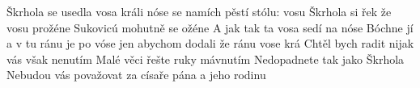 \begin{TEXT}{Škrhola}
\SLOKA {}   se  \NL
{}usedla vosa králi nóse \NL
{} se namích  pěstí  stólu:  \NL
{}  vosu  
\SLOKA Škrhola si řek že vosu prožéne \NL
Sukovicú mohutně se ožéne \NL
A jak tak ta vosa sedí na nóse \NL
Bóchne jí a v tu ránu je po vóse 
\SLOKA {} jen abychom  dodali \NL
že  ránu  vose  krá 
\SLOKA Chtěl bych radit nijak vás však nenutím \NL
Malé věci řešte ruky mávnutím \NL
Nedopadnete tak jako Škrhola \NL
Nebudou vás považovat \NL
za císaře pána a jeho rodinu \NL
\end{TEXT}
